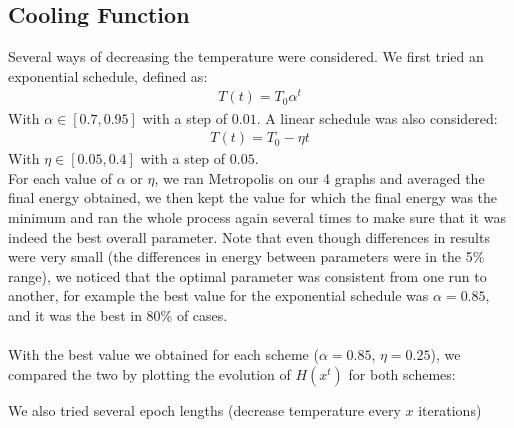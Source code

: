 \documentclass[a4paper]{article}
\begin{document}
\subsection{Cooling Function}
Several ways of decreasing the temperature were considered. We first tried an exponential schedule, defined as:
\begin{align*}
T(t) = T_0\alpha^{t}
\end{align*}
With $\alpha \in [0.7,0.95]$ with a step of $0.01$. A linear schedule was also considered:
\begin{align*}
T(t) = T_0 - \eta t
\end{align*}
With $\eta \in [0.05,0.4]$ with a step of $0.05$.\\
For each value of $\alpha$ or $\eta$, we ran Metropolis on our 4 graphs and averaged the final energy obtained, we then kept the value for which the final energy was the minimum and ran the whole process again several times to make sure that it was indeed the best overall parameter. Note that even though differences in results were very small (the differences in energy between parameters were in the 5\% range), we noticed that the optimal parameter was consistent from one run to another, for example the best value for the exponential schedule was $\alpha = 0.85$, and it was the best in 80\% of cases.\\\\
With the best value we obtained for each scheme ($\alpha = 0.85$, $\eta = 0.25$), we compared the two by plotting the evolution of $H(x^t)$ for both schemes:
\begin{figure}[h!]
\end{figure}
We also tried several epoch lengths (decrease temperature every $x$ iterations)



\end{document}
